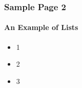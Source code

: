 \frametitle{Sample Page 2}
\framesubtitle{An Example of Lists}
\begin{itemize}
	\item 1
	\item 2
	\item 3
\end{itemize}